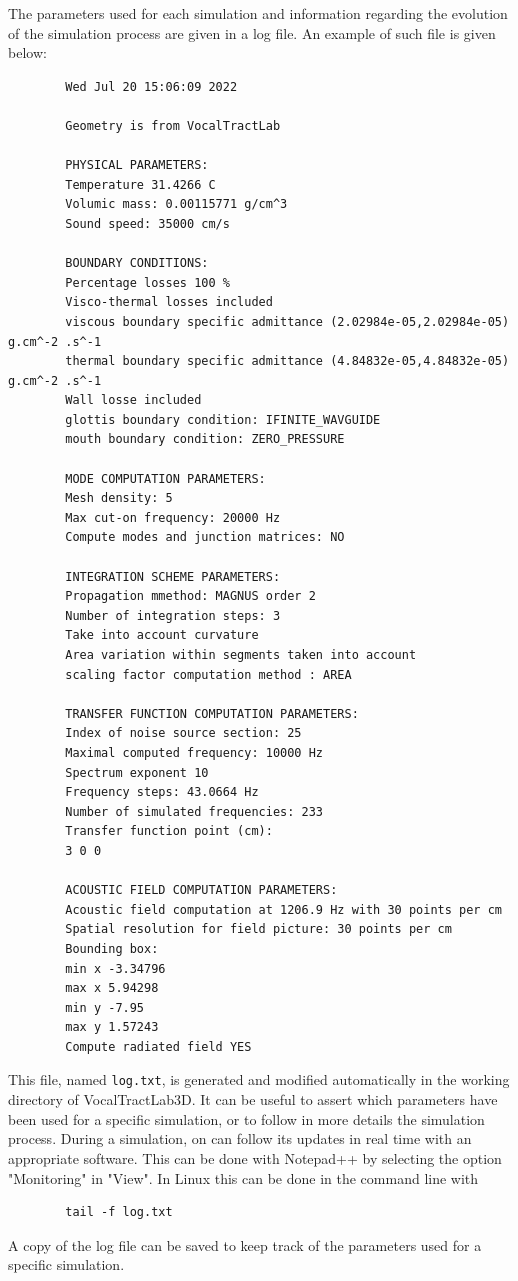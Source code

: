 \documentclass[]{article}
\begin{document}
	The parameters used for each simulation and information regarding the evolution of the 
	simulation process are given in a log file. An example of such file is given below:
	\lstset{language=}
	\begin{lstlisting}
		Wed Jul 20 15:06:09 2022
		
		Geometry is from VocalTractLab
		
		PHYSICAL PARAMETERS:
		Temperature 31.4266 C
		Volumic mass: 0.00115771 g/cm^3
		Sound speed: 35000 cm/s
		
		BOUNDARY CONDITIONS:
		Percentage losses 100 %
		Visco-thermal losses included
		viscous boundary specific admittance (2.02984e-05,2.02984e-05) g.cm^-2 .s^-1
		thermal boundary specific admittance (4.84832e-05,4.84832e-05) g.cm^-2 .s^-1
		Wall losse included
		glottis boundary condition: IFINITE_WAVGUIDE
		mouth boundary condition: ZERO_PRESSURE
		
		MODE COMPUTATION PARAMETERS:
		Mesh density: 5
		Max cut-on frequency: 20000 Hz
		Compute modes and junction matrices: NO
		
		INTEGRATION SCHEME PARAMETERS:
		Propagation mmethod: MAGNUS order 2
		Number of integration steps: 3
		Take into account curvature
		Area variation within segments taken into account
		scaling factor computation method : AREA
		
		TRANSFER FUNCTION COMPUTATION PARAMETERS:
		Index of noise source section: 25
		Maximal computed frequency: 10000 Hz
		Spectrum exponent 10
		Frequency steps: 43.0664 Hz
		Number of simulated frequencies: 233
		Transfer function point (cm): 
		3 0 0
		
		ACOUSTIC FIELD COMPUTATION PARAMETERS:
		Acoustic field computation at 1206.9 Hz with 30 points per cm
		Spatial resolution for field picture: 30 points per cm
		Bounding box:
		min x -3.34796
		max x 5.94298
		min y -7.95
		max y 1.57243
		Compute radiated field YES
	\end{lstlisting}
	
	This file, named \texttt{log.txt}, is generated and modified automatically in the working 
	directory of VocalTractLab3D.
	It can be useful to assert which parameters have been used for a specific simulation,
	or to follow in more details the simulation process.
	During a simulation, on can follow its updates in real time with an appropriate software.
	This can be done with Notepad++ by selecting the option "Monitoring" in "View".
	In Linux this can be done in the command line with 
	\lstset{language=bash}
	\begin{lstlisting}
		tail -f log.txt
	\end{lstlisting}
	A copy of the log file can be saved
	to keep track of the parameters used for a specific simulation.
	
\end{document}
